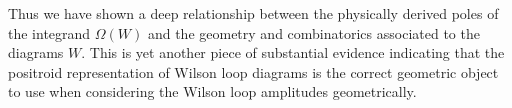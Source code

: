 \documentclass[11pt]{article}
\newcommand{\note}{\todo[color=green!40]}
\theoremstyle{remark}
\theoremstyle{definition}
\begin{document}
Thus we have shown a deep relationship between the physically derived poles of the integrand $\Omega(W)$ and the geometry and combinatorics associated to the diagrams $W$. This is yet another piece of substantial evidence indicating that the positroid representation of Wilson loop diagrams is the correct geometric object to use when considering the Wilson loop amplitudes geometrically. 











\end{document}
